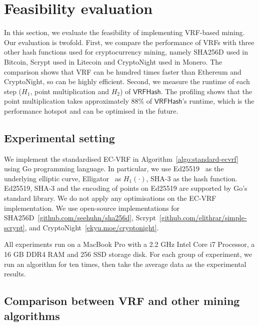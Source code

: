 \section{Feasibility evaluation}
\label{sec:feasibility}

In this section, we evaluate the feasibility of implementing VRF-based mining.
Our evaluation is twofold.
First, we compare the performance of VRFs with three other hash functions used for cryptocurrency mining, namely SHA256D used in Bitcoin, Scrypt used in Litecoin and CryptoNight used in Monero.
The comparison shows that VRF can be hundred times faster than Ethereum and CryptoNight, so can be highly efficient.
Second, we measure the runtime of each step ($H_1$, point multiplication and $H_2$) of $\mathsf{VRFHash}$.
The profiling shows that the point multiplication takes approximately 88\% of $\mathsf{VRFHash}$'s runtime, which is the performance hotspot and can be optimised in the future.

\subsection{Experimental setting}

We implement the standardised EC-VRF in Algorithm~\ref{algo:standard-ecvrf} using Go programming language.
In particular, we use Ed25519~\cite{bernstein2012high} as the underlying elliptic curve, Elligator~\cite{bernstein2013elligator} as $H_1(\cdot)$, SHA-3 as the hash function.
Ed25519, SHA-3 and the encoding of points on Ed25519 are supported by Go's standard library.
We do not apply any optimisations on the EC-VRF implementation.
We use open-source implementations for SHA256D~\ref{github.com/seehuhn/sha256d}, Scrypt~\ref{github.com/elithrar/simple-scrypt}, and CryptoNight~\ref{ekyu.moe/cryptonight}.

All experiments run on a MacBook Pro with a 2.2 GHz Intel Core i7 Processor, a 16 GB DDR4 RAM and 256 SSD storage disk.
For each group of experiment, we run an algorithm for ten times, then take the average data as the experimental results.




\subsection{Comparison between VRF and other mining algorithms}

